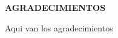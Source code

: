 \begin{agradecimientos}
\vspace{50 mm}

\begin{center}
  \normalsize\textbf{{AGRADECIMIENTOS}}
\end{center}

Aqui van los agradecimientos


\end{agradecimientos}